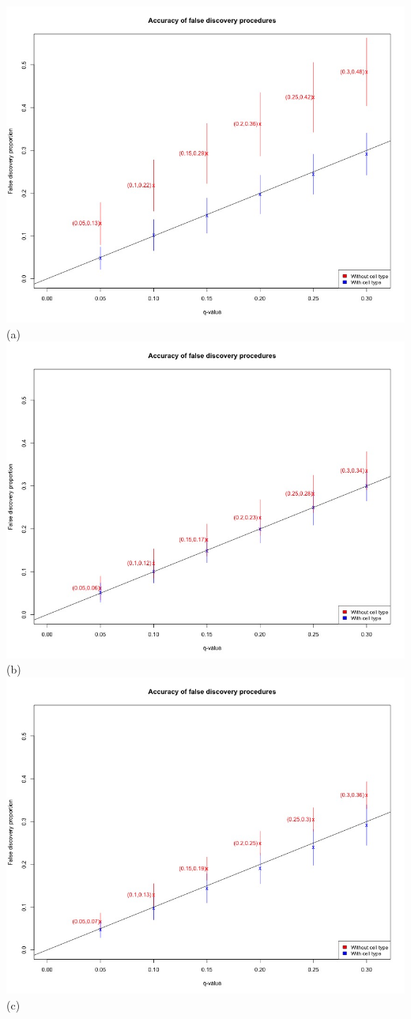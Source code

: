 \documentclass{article}
\begin{document}
\includegraphics[scale=0.25]{Fdp_1p3_pi00p7.jpeg}(a)
\includegraphics[scale=0.25]{Fdp_13p0.jpeg}(b)\\
\includegraphics[scale=0.25]{Fdp_0p13.jpeg}(c)
\end{document}
